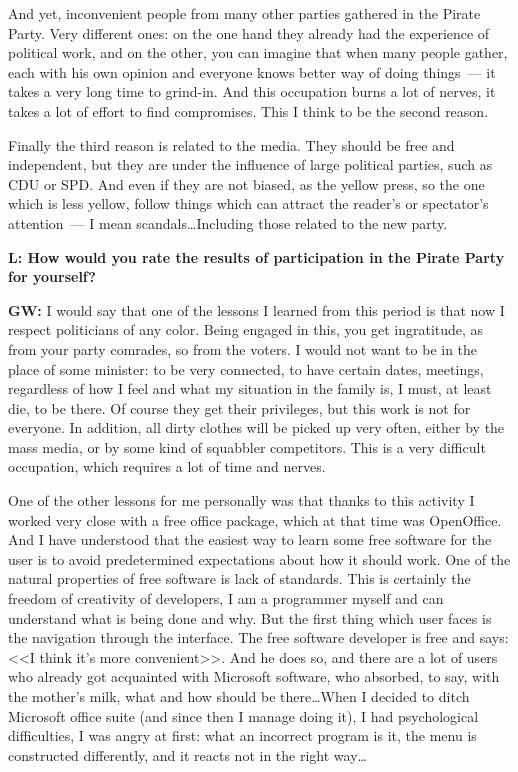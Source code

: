 \documentclass[10pt, a5paper]{article}
\begin{document}
\begin{Parallel}[p]{}{}
{And yet, inconvenient people from many other parties gathered in the Pirate Party. Very different ones: on the one hand they already had the experience of political work, and on the other, you can imagine that when many people gather, each with his own opinion and everyone knows better way of doing things~--- it takes a very long time to grind-in. And this occupation burns a lot of nerves, it takes a lot of effort to find compromises. This I think to be the second reason.

Finally the third reason is related to the media. They should be free and independent, but they are under the influence of large political parties, such as CDU or SPD. And even if they are not biased, as the yellow press, so the one which is less yellow, follow things which can attract the reader's or spectator's attention~--- I mean scandals\ldots Including those related to the new party.

{\noindent \bf L: How would you rate the results of participation in the Pirate Party for yourself?}

{\noindent \bf GW:} I would say that one of the lessons I learned from this period is that now I respect politicians of any color. Being engaged in this, you get ingratitude, as from your party comrades, so from the voters. I would not want to be in the place of some minister: to be very connected, to have certain dates, meetings, regardless of how I feel and what my situation in the family is, I must, at least die, to be there. Of course they get their privileges, but this work is not for everyone. In addition, all dirty clothes will be picked up very often, either by the mass media, or by some kind of squabbler competitors. This is a very difficult occupation, which requires a lot of time and nerves.

One of the other lessons for me personally was that thanks to this activity I worked very close with a free office package, which at that time was OpenOffice. And I have understood that the easiest way to learn some free software for the user is to avoid predetermined expectations about how it should work. One of the natural properties of free software is lack of standards. This is certainly the freedom of creativity of developers, I am a programmer myself and can understand what is being done and why.
But the first thing which user faces is the navigation through the interface. The free software developer is free and says: <<I think it's more convenient>>. And he does so, and there are a lot of users who already got acquainted with Microsoft software, who absorbed, to say, with the mother's milk, what and how should be there\ldots When I decided to ditch Microsoft office suite (and since then I manage doing it), I had psychological difficulties, I was angry at first: what an incorrect program is it, the menu is constructed differently, and it reacts not in the right way\ldots

}
\end{Parallel}
\end{document}
